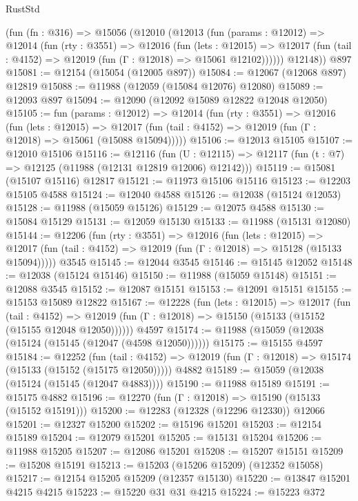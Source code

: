 \begin{lexlean}{RustStd}
\begin{coremodule}
    (fun (fn : @316) =>
    @15056
      (@12010
        (@12013
          (fun (params : @12012) =>
          @12014
            (fun (rty : @3551) =>
            @12016
              (fun (lets : @12015) =>
              @12017 (fun (tail : @4152) => @12019 (fun (Γ : @12018) => @15061 @12102))))))
        @12148))
    @897
@15081 := @12154 (@15054 (@12005 @897))
@15084 := @12067 (@12068 @897) @12819
@15088 := @11988 (@12059 (@15084 @12076) @12080)
@15089 := @12093 @897
@15094 := @12090 (@12092 @15089 @12822 @12048 @12050)
@15105 := fun (params : @12012) =>
  @12014
    (fun (rty : @3551) =>
    @12016
      (fun (lets : @12015) =>
      @12017 (fun (tail : @4152) => @12019 (fun (Γ : @12018) => @15061 (@15088 @15094)))))
@15106 := @12013 @15105
@15107 := @12010 @15106
@15116 := @12116
    (fun (U : @12115) => @12117 (fun (t : @7) => @12125 (@11988 (@12131 @12819 @12006) @12142)))
@15119 := @15081 (@15107 @15116) @12817
@15121 := @11973 @15106 @15116
@15123 := @12203 @15105 @4588
@15124 := @12040 @4588
@15126 := @12038 (@15124 @12053)
@15128 := @11988 (@15059 @15126)
@15129 := @12075 @4588
@15130 := @15084 @15129
@15131 := @12059 @15130
@15133 := @11988 (@15131 @12080)
@15144 := @12206
    (fun (rty : @3551) =>
    @12016
      (fun (lets : @12015) =>
      @12017 (fun (tail : @4152) => @12019 (fun (Γ : @12018) => @15128 (@15133 @15094)))))
    @3545
@15145 := @12044 @3545
@15146 := @15145 @12052
@15148 := @12038 (@15124 @15146)
@15150 := @11988 (@15059 @15148)
@15151 := @12088 @3545
@15152 := @12087 @15151
@15153 := @12091 @15151
@15155 := @15153 @15089 @12822
@15167 := @12228
    (fun (lets : @12015) =>
    @12017
      (fun (tail : @4152) =>
      @12019 (fun (Γ : @12018) => @15150 (@15133 (@15152 (@15155 @12048 @12050))))))
    @4597
@15174 := @11988 (@15059 (@12038 (@15124 (@15145 (@12047 (@4598 @12050))))))
@15175 := @15155 @4597
@15184 := @12252
    (fun (tail : @4152) => @12019 (fun (Γ : @12018) => @15174 (@15133 (@15152 (@15175 @12050)))))
    @4882
@15189 := @15059 (@12038 (@15124 (@15145 (@12047 @4883))))
@15190 := @11988 @15189
@15191 := @15175 @4882
@15196 := @12270 (fun (Γ : @12018) => @15190 (@15133 (@15152 @15191)))
@15200 := @12283 (@12328 (@12296 @12330)) @12066
@15201 := @12327 @15200
@15202 := @15196 @15201
@15203 := @12154 @15189
@15204 := @12079 @15201
@15205 := @15131 @15204
@15206 := @11988 @15205
@15207 := @12086 @15201
@15208 := @15207 @15151
@15209 := @15208 @15191
@15213 := @15203 (@15206 @15209) (@12352 @15058)
@15217 := @12154 @15205 @15209 (@12357 @15130)
@15220 := @13847 @15201 @4215 @4215
@15223 := @15220 @31 @31 @4215
@15224 := @15223 @372

\end{coremodule}
\end{lexlean}
